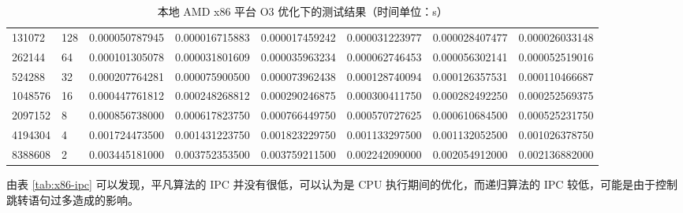 \documentclass[a4paper]{article}
\begin{document}
\begin{table}[]
{\begin{tabular}{llllllll}
      131072  & 128     & 0.000050787945 & 0.000016715883  & 0.000017459242 & 0.000031223977 & 0.000028407477 & 0.000026033148 \\
      262144  & 64      & 0.000101305078 & 0.000031801609  & 0.000035963234 & 0.000062746453 & 0.000056302141 & 0.000052519016 \\
      524288  & 32      & 0.000207764281 & 0.000075900500  & 0.000073962438 & 0.000128740094 & 0.000126357531 & 0.000110466687 \\
      1048576 & 16      & 0.000447761812 & 0.000248268812  & 0.000290246875 & 0.000300411750 & 0.000282492250 & 0.000252569375 \\
      2097152 & 8       & 0.000856738000 & 0.000617823750  & 0.000766449750 & 0.000570727625 & 0.000610684500 & 0.000525231750 \\
      4194304 & 4       & 0.001724473500 & 0.001431223750  & 0.001823229750 & 0.001133297500 & 0.001132052500 & 0.001026378750 \\
      8388608 & 2       & 0.003445181000 & 0.003752353500  & 0.003759211500 & 0.002242090000 & 0.002054912000 & 0.002136882000
    \end{tabular}%
  }
  \caption{本地 AMD x86 平台 O3 优化下的测试结果（时间单位：s）}
  \label{tab:x86-O3-test}
\end{table}

\begin{table}[]
  \centering
  \caption{perf 测试本地 AMD x86 平台 O0 和 O3 优化下的 IPC}
  \label{tab:x86-ipc}
\end{table}

由表 \ref{tab:x86-ipc} 可以发现，平凡算法的 IPC 并没有很低，可以认为是 CPU 执行期间的优化，而递归算法的 IPC 较低，可能是由于控制跳转语句过多造成的影响。
\end{document}
